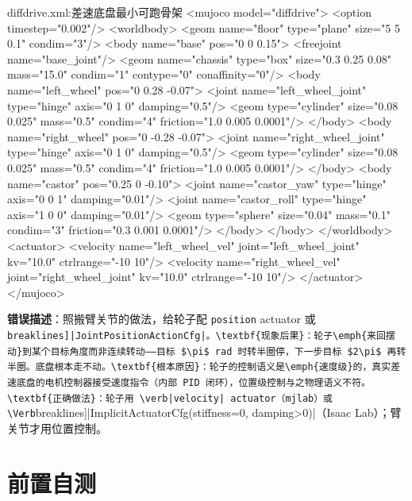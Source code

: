 \begin{codebox}[text]{diffdrive.xml:差速底盘最小可跑骨架}
<mujoco model="diffdrive">
  <option timestep="0.002"/>
  <worldbody>
    <geom name="floor" type="plane" size="5 5 0.1" condim="3"/>
    <body name="base" pos="0 0 0.15">
      <freejoint name="base_joint"/>
      <geom name="chassis" type="box" size="0.3 0.25 0.08" mass="15.0"
            condim="1" contype="0" conaffinity="0"/>
      <body name="left_wheel" pos="0 0.28 -0.07">
        <joint name="left_wheel_joint" type="hinge" axis="0 1 0" damping="0.5"/>
        <geom type="cylinder" size="0.08 0.025" mass="0.5"
              condim="4" friction="1.0 0.005 0.0001"/>
      </body>
      <body name="right_wheel" pos="0 -0.28 -0.07">
        <joint name="right_wheel_joint" type="hinge" axis="0 1 0" damping="0.5"/>
        <geom type="cylinder" size="0.08 0.025" mass="0.5"
              condim="4" friction="1.0 0.005 0.0001"/>
      </body>
      <body name="castor" pos="0.25 0 -0.10">
        <joint name="castor_yaw" type="hinge" axis="0 0 1" damping="0.01"/>
        <joint name="castor_roll" type="hinge" axis="1 0 0" damping="0.01"/>
        <geom type="sphere" size="0.04" mass="0.1"
              condim="3" friction="0.3 0.001 0.0001"/>
      </body>
    </body>
  </worldbody>
  <actuator>
    <velocity name="left_wheel_vel"  joint="left_wheel_joint"  kv="10.0" ctrlrange="-10 10"/>
    <velocity name="right_wheel_vel" joint="right_wheel_joint" kv="10.0" ctrlrange="-10 10"/>
  </actuator>
</mujoco>
\end{codebox}

\begin{pitfall}
\textbf{错误描述}：照搬臂关节的做法，给轮子配 \verb|position| actuator 或 \Verb[breaklines]|JointPositionActionCfg|。\textbf{现象后果}：轮子\emph{来回摆动}到某个目标角度而非连续转动——目标 $\pi$ rad 时转半圈停，下一步目标 $2\pi$ 再转半圈。底盘根本走不动。\textbf{根本原因}：轮子的控制语义是\emph{速度级}的，真实差速底盘的电机控制器接受速度指令（内部 PID 闭环），位置级控制与之物理语义不符。\textbf{正确做法}：轮子用 \verb|velocity| actuator（mjlab）或 \Verb[breaklines]|ImplicitActuatorCfg(stiffness=0, damping>0)|（Isaac Lab）；臂关节才用位置控制。
\end{pitfall}

\section{前置自测}
\label{sec:rlmc-wh-pretest}

